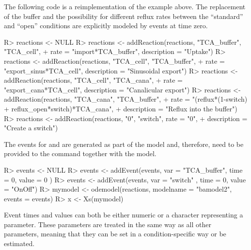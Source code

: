 \documentclass[article]{jss}
\begin{document}
The following code is a reimplementation of the example above. The replacement of the buffer and the possibility for different reflux rates between the ``standard'' and  ``open'' conditions are explicitly modeled by events at time zero. 
%
\begin{CodeChunk}
\begin{CodeInput}
R> reactions <- NULL
R> reactions <- addReaction(reactions, "TCA_buffer", "TCA_cell",
+    rate = "import*TCA_buffer", description = "Uptake")
R> reactions <- addReaction(reactions, "TCA_cell", "TCA_buffer",
+    rate = "export_sinus*TCA_cell", description = "Sinusoidal export")
R> reactions <- addReaction(reactions, "TCA_cell", "TCA_cana",
+    rate = "export_cana*TCA_cell", description = "Canalicular export")
R> reactions <- addReaction(reactions, "TCA_cana", "TCA_buffer",
+    rate = "(reflux*(1-switch) + reflux_open*switch)*TCA_cana",
+    description = "Reflux into the buffer")
R> reactions <- addReaction(reactions, "0", "switch", rate = "0",
+    description = "Create a switch")
\end{CodeInput}
\end{CodeChunk}
%
The events for  and  are generated as part of the model and, therefore, need to be provided to the  command together with the model.
%
\begin{CodeChunk}
\begin{CodeInput}
R> events <- NULL
R> events <- addEvent(events, var = "TCA_buffer", time = 0, value = 0      )
R> events <- addEvent(events, var = "switch"    , time = 0, value = "OnOff")
R> mymodel <- odemodel(reactions, modelname = "bamodel2", events = events)
R> x <- Xs(mymodel)
\end{CodeInput}
\end{CodeChunk}
%
Event times and values can both be either numeric or a character representing a parameter. These parameters are treated in the same way as all other parameters, meaning that they can be set in a condition-specific way or be estimated.
\end{document}
